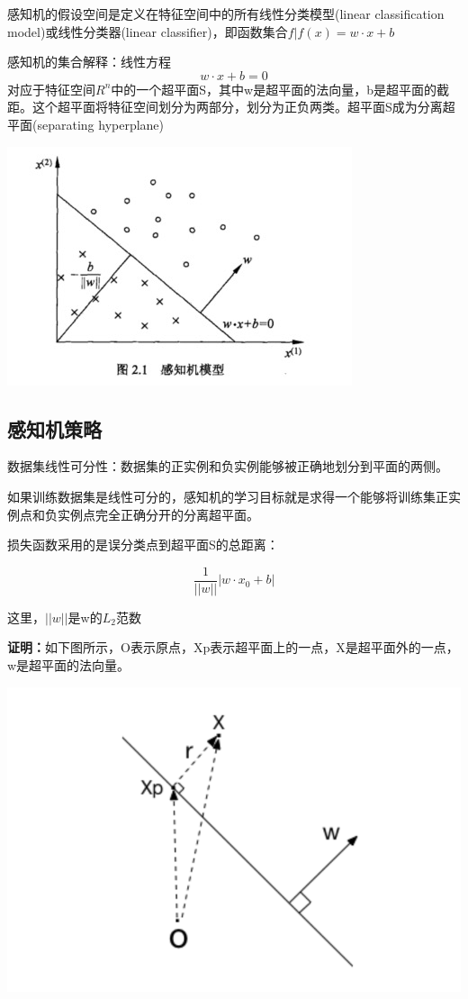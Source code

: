 \documentclass{ctexart}
\begin{document}
	感知机的假设空间是定义在特征空间中的所有线性分类模型(linear classification model)或线性分类器(linear classifier)，即函数集合\(f|f(x) = w·x + b\)
	
	感知机的集合解释：线性方程
	\[w·x + b = 0\]
	对应于特征空间\(R^n\)中的一个超平面S，其中w是超平面的法向量，b是超平面的截距。这个超平面将特征空间划分为两部分，划分为正负两类。超平面S成为分离超平面(separating hyperplane)
	
	\begin{center}
		\includegraphics[width=0.8\linewidth]{pic/perceptron_model}
	\end{center}

	\subsection{感知机策略}
	
	数据集线性可分性：数据集的正实例和负实例能够被正确地划分到平面的两侧。
	
	如果训练数据集是线性可分的，感知机的学习目标就是求得一个能够将训练集正实例点和负实例点完全正确分开的分离超平面。
	
	损失函数采用的是误分类点到超平面S的总距离：
	
	\[\frac{1}{||w||}|w·x_0 + b|\]
	
	这里，\(||w||\)是w的\(L_2\)范数
	
	\textbf{证明：}如下图所示，O表示原点，Xp表示超平面上的一点，X是超平面外的一点，w是超平面的法向量。
	
	\begin{center}
	\includegraphics[width=0.8\linewidth]{pic/hyperplane}
	\end{center}
	
\end{document}
